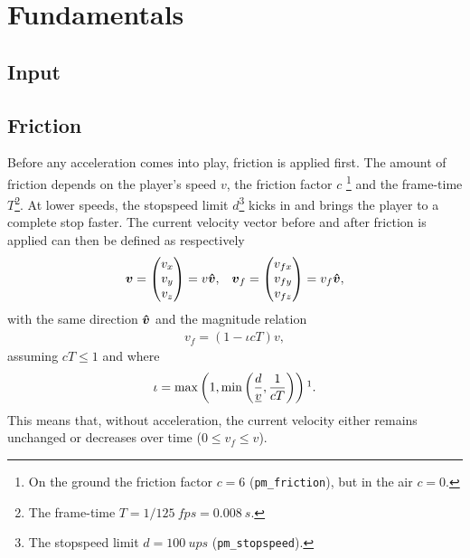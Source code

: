\section{Fundamentals}
\label{sec:fundamentals}
\cite{hl_physics}

\subsection{Input}

\subsection{Friction}
Before any acceleration comes into play, friction is applied first. The amount of friction depends on the player's speed $v$, the friction factor $c$%
\footnote{On the ground the friction factor $c=6$ (\texttt{pm\_friction}), but in the air $c=0$.} and the frame-time $T$\footnote{The frame-time $T = 1 / \qty{125}{fps} = \qty{0.008}{s}$.}. At lower speeds, the stopspeed limit $d$\footnote{The stopspeed limit $d = \qty{100}{ups}$ (\texttt{pm\_stopspeed}).} kicks in and brings the player to a complete stop faster. The current velocity vector before and after friction is applied can then be defined as respectively
\begin{align*}
\boldsymbol{v} =
\begin{pmatrix}
v_x \\ v_y \\ v_z
\end{pmatrix} = v \boldsymbol{\hat{v}},
&&
\boldsymbol{v}_f =
\begin{pmatrix}
v_{fx} \\ v_{fy} \\ v_{fz}
\end{pmatrix} = v_f \boldsymbol{\hat{v}},
\end{align*}
with the same direction $\boldsymbol{\hat{v}}$ and the magnitude relation
\begin{align}
\label{eq:vf}
v_f = (1 - \iota cT) v,
\end{align}
assuming $cT \le 1$ and where
\begin{align*}
\iota = \max\left(1, \min\left(\frac{d}{\flat{v}}, \frac{1}{cT}\right)\right)\protect\footnotemark{}.
\end{align*}
%
This means that, without acceleration, the current velocity either remains unchanged or decreases over time ($0 \le v_f \le v$).

